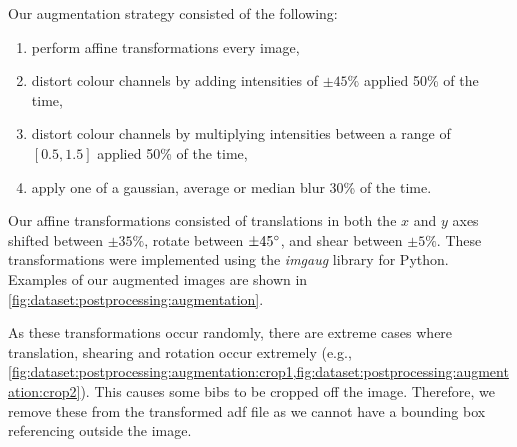 Our augmentation strategy consisted of the following:

\begin{enumerate}
  \item perform affine transformations every image,
  \item distort colour channels by adding intensities of $\pm45\%$ applied 50\% of the time,
  \item distort colour channels by multiplying intensities between a range of $[0.5, 1.5]$ applied 50\% of the time,
  \item apply one of a gaussian, average or median blur 30\% of the time.
\end{enumerate}

Our affine transformations consisted of translations in both the $x$ and $y$ axes shifted between $\pm35\%$, rotate between $\pm45\degree$, and shear between $\pm5\%$. These transformations were implemented using the \textit{imgaug} library for Python. Examples of our augmented images are shown in \cref{fig:dataset:postprocessing:augmentation}.

As these transformations occur randomly, there are extreme cases where translation, shearing and rotation occur extremely (e.g., \cref{fig:dataset:postprocessing:augmentation:crop1,fig:dataset:postprocessing:augmentation:crop2}). This causes some bibs to be cropped off the image. Therefore, we remove these from the transformed \gls{adf} file as we cannot have a bounding box referencing outside the image.

